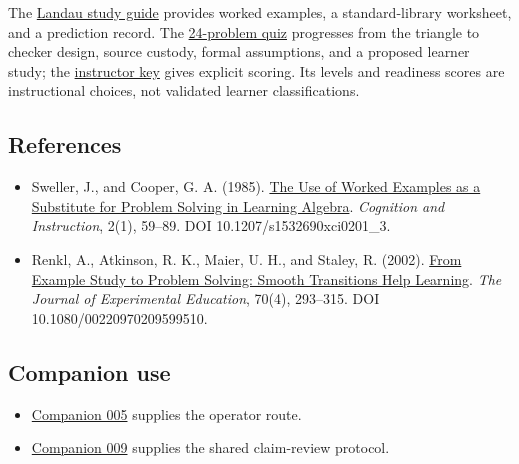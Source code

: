 \documentclass[
  11pt,
]{article}
\providecommand{\tightlist}{%
  \setlength{\itemsep}{0pt}\setlength{\parskip}{0pt}}
\begin{document}
The \href{_lev_landau_theoretical_minimum_quiz/study_guide.md}{Landau
study guide} provides worked examples, a standard-library worksheet, and
a prediction record. The
\href{_lev_landau_theoretical_minimum_quiz/quiz.md}{24-problem quiz}
progresses from the triangle to checker design, source custody, formal
assumptions, and a proposed learner study; the
\href{_lev_landau_theoretical_minimum_quiz/instructor_key.md}{instructor
key} gives explicit scoring. Its levels and readiness scores are
instructional choices, not validated learner classifications.

\hypertarget{references}{%
\subsection{References}\label{references}}

\begin{itemize}
\tightlist
\item
  Sweller, J., and Cooper, G. A. (1985).
  \href{https://doi.org/10.1207/s1532690xci0201_3}{The Use of Worked
  Examples as a Substitute for Problem Solving in Learning Algebra}.
  \emph{Cognition and Instruction}, 2(1), 59--89. DOI
  10.1207/s1532690xci0201\_3.
\item
  Renkl, A., Atkinson, R. K., Maier, U. H., and Staley, R. (2002).
  \href{https://doi.org/10.1080/00220970209599510}{From Example Study to
  Problem Solving: Smooth Transitions Help Learning}. \emph{The Journal
  of Experimental Education}, 70(4), 293--315. DOI
  10.1080/00220970209599510.
\end{itemize}

\hypertarget{companion-use}{%
\subsection{Companion use}\label{companion-use}}

\begin{itemize}
\tightlist
\item
  \href{https://github.com/dbccpage/the_symbol_game/blob/52cb5457f6c485ba548cfd292f6012a941ed22cf/omega_engine_atlas/coda_atlas/omega_engine_symbol_game/005_pfp_practitioners_field_manual/paper.md}{Companion
  005} supplies the operator route.
\item
  \href{https://github.com/dbccpage/the_symbol_game/blob/52cb5457f6c485ba548cfd292f6012a941ed22cf/omega_engine_atlas/coda_atlas/omega_engine_symbol_game/009_pfp_adversarial_dialectics_and_terminal_reality_gates/paper.md}{Companion
  009} supplies the shared claim-review protocol.
\end{itemize}
\end{document}
